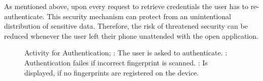 As mentioned above, upon every request to retrieve credentials the user has to re-authenticate. This security mechanism can protect from an unintentional distribution of sensitive data. Therefore, the risk of threatened security can be reduced whenever the user left their phone unattended with the open application. \\

\begin{figure}[!htb]
\centering
{}
\qquad
{}
\qquad
{}
\caption[Activity for Authentication]{Activity for Authentication; \protect{}: The user is asked to authenticate. \protect{}: Authentication failes if incorrect fingerprint is scanned. \protect{}: Is displayed, if no fingerprints are registered on the device.}
\label{fig:authentication}
\end{figure}

